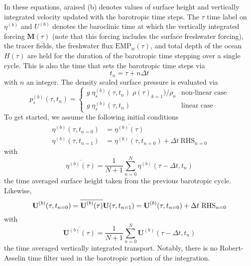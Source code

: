 \documentclass[../tex_main/NEMO_manual]{subfiles}
\begin{document}
In these equations, araised (b) denotes values of surface height and
vertically integrated velocity updated with the barotropic time steps.
The $\tau$ time label on $\eta^{(b)}$ and $U^{(b)}$ denotes the baroclinic time at which
the vertically integrated forcing $\textbf{M}(\tau)$
(note that this forcing includes the surface freshwater forcing), the tracer fields,
the freshwater flux $\text{EMP}_w(\tau)$, and total depth of the ocean $H(\tau)$ are held for
the duration of the barotropic time stepping over a single cycle.
This is also the time that sets the barotropic time steps via 
\begin{equation} \label{eq:DYN_spg_ts_t}
t_n=\tau+n\Delta t   
\end{equation}
with $n$ an integer.
The density scaled surface pressure is evaluated via 
\begin{equation} \label{eq:DYN_spg_ts_ps}
p_s^{(b)}(\tau,t_{n}) = \begin{cases}
	g \;\eta_s^{(b)}(\tau,t_{n}) \;\rho(\tau)_{k=1}) / \rho_o  &      \text{non-linear case} \\
	g \;\eta_s^{(b)}(\tau,t_{n})  &      \text{linear case} 
	\end{cases}
\end{equation}
To get started, we assume the following initial conditions 
\begin{equation} \label{eq:DYN_spg_ts_eta}
\begin{split}
\eta^{(b)}(\tau,t_{n=0}) &= \overline{\eta^{(b)}(\tau)}
\\
\eta^{(b)}(\tau,t_{n=1}) &= \eta^{(b)}(\tau,t_{n=0}) + \Delta t \ \text{RHS}_{n=0} 
\end{split}
\end{equation}
with 
\begin{equation} \label{eq:DYN_spg_ts_etaF}
 \overline{\eta^{(b)}(\tau)} = \frac{1}{N+1} \sum\limits_{n=0}^N \eta^{(b)}(\tau-\Delta t,t_{n})
\end{equation}
the time averaged surface height taken from the previous barotropic cycle.
Likewise,
\begin{equation} \label{eq:DYN_spg_ts_u}
\textbf{U}^{(b)}(\tau,t_{n=0}) = \overline{\textbf{U}^{(b)}(\tau)}	\\
\\
\textbf{U}(\tau,t_{n=1}) = \textbf{U}^{(b)}(\tau,t_{n=0}) + \Delta t \ \text{RHS}_{n=0}  	
\end{equation}
with 
\begin{equation} \label{eq:DYN_spg_ts_u}
 \overline{\textbf{U}^{(b)}(\tau)} 
 	= \frac{1}{N+1} \sum\limits_{n=0}^N\textbf{U}^{(b)}(\tau-\Delta t,t_{n})
\end{equation}
the time averaged vertically integrated transport.
Notably, there is no Robert-Asselin time filter used in the barotropic portion of the integration. 
\end{document}
